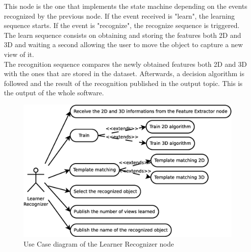 	This node is the one that implements the state machine depending on the events recognized by the previous node. If the event received is "learn", the learning sequence starts. If the event is "recognize", the recognize sequence is triggered. 
	\\

	The learn sequence consists on obtaining and storing the features both 2D and 3D and waiting a second allowing the user to move the object to capture a new view of it. 
	\\

	The recognition sequence compares the newly obtained features both 2D and 3D with the ones that are stored in the dataset. Afterwards, a decision algorithm is followed and the result of the recognition published in the output topic. This is the output of the whole software. 

	\begin{figure}[H]
		\centering
			\includegraphics[scale=0.4]{img/diagrams/uc_learner_recognizer.eps}
			\caption[Use case diagram Learner Recognizer node]{Use Case diagram of the Learner Recognizer node}
		
	\end{figure}



